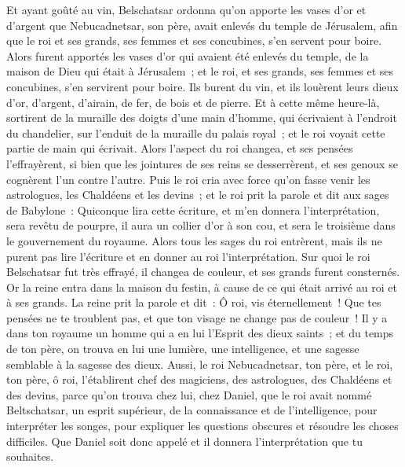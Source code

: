 \begin{multicols}{2}
Et ayant goûté au vin, Belschatsar ordonna qu'on apporte les vases d'or et d'argent que Nebucadnetsar, son père, avait enlevés du temple de Jérusalem, afin que le roi et ses grands, ses femmes et ses concubines, s'en servent pour boire.
Alors furent apportés les vases d'or qui avaient été enlevés du temple, de la maison de Dieu qui était à Jérusalem~; et le roi, et ses grands, ses femmes et ses concubines, s'en servirent pour boire.
Ils burent du vin, et ils louèrent leurs dieux d'or, d'argent, d'airain, de fer, de bois et de pierre.
Et à cette même heure-là, sortirent de la muraille des doigts d'une main d'homme, qui écrivaient à l'endroit du chandelier, sur l'enduit de la muraille du palais royal~; et le roi voyait cette partie de main qui écrivait.
Alors l'aspect du roi changea, et ses pensées l'effrayèrent, si bien que les jointures de ses reins se desserrèrent, et ses genoux se cognèrent l'un contre l'autre.
Puis le roi cria avec force qu'on fasse venir les astrologues, les Chaldéens et les devins~; et le roi prit la parole et dit aux sages de Babylone~: Quiconque lira cette écriture, et m'en donnera l'interprétation, sera revêtu de pourpre, il aura un collier d'or à son cou, et sera le troisième dans le gouvernement du royaume.
Alors tous les sages du roi entrèrent, mais ils ne purent pas lire l'écriture et en donner au roi l'interprétation.
Sur quoi le roi Belschatsar fut très effrayé, il changea de couleur, et ses grands furent consternés.
Or la reine entra dans la maison du festin, à cause de ce qui était arrivé au roi et à ses grands. La reine prit la parole et dit~: Ô roi, vis éternellement~! Que tes pensées ne te troublent pas, et que ton visage ne change pas de couleur~!
Il y a dans ton royaume un homme qui a en lui l'Esprit des dieux saints~; et du temps de ton père, on trouva en lui une lumière, une intelligence, et une sagesse semblable à la sagesse des dieux. Aussi, le roi Nebucadnetsar, ton père, et le roi, ton père, ô roi, l'établirent chef des magiciens, des astrologues, des Chaldéens et des devins,
parce qu'on trouva chez lui, chez Daniel, que le roi avait nommé Beltschatsar, un esprit supérieur, de la connaissance et de l'intelligence, pour interpréter les songes, pour expliquer les questions obscures et résoudre les choses difficiles. Que Daniel soit donc appelé et il donnera l'interprétation que tu souhaites.

\end{multicols}
